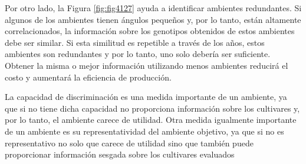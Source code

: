 Por otro lado, la Figura \ref{fig:fig4127} ayuda a identificar ambientes redundantes. Si algunos de los ambientes tienen ángulos pequeños y, por lo tanto, están altamente correlacionados, la información sobre los genotipos obtenidos de estos ambientes debe ser similar. Si esta similitud es repetible a través de los años, estos ambientes son redundantes y por lo tanto, uno solo debería ser suficiente. Obtener la misma o mejor información utilizando menos ambientes reducirá el costo y aumentará la eficiencia de producción.



La capacidad de discriminación es una medida importante de un ambiente, ya que si no tiene dicha capacidad no proporciona información sobre los cultivares y, por lo tanto, el ambiente carece de utilidad. Otra medida igualmente importante de un ambiente es su representatividad del ambiente objetivo, ya que si no es representativo no solo que carece de utilidad sino que también puede proporcionar información sesgada sobre los cultivares evaluados

